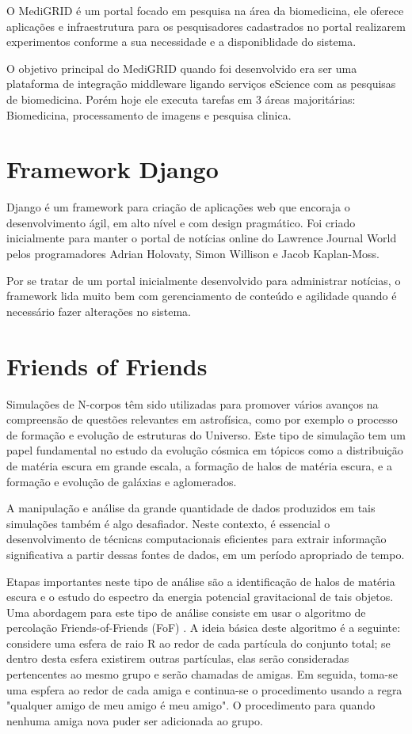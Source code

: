 \documentclass[tg]{mdtufsm}
\begin{document}
O MediGRID \cite{medigrid} é um portal focado em pesquisa na área da biomedicina, ele oferece aplicações e infraestrutura para os pesquisadores cadastrados no portal realizarem experimentos conforme a sua necessidade e a disponiblidade do sistema. 

O objetivo principal do MediGRID quando foi desenvolvido era ser uma plataforma de integração middleware ligando serviços eScience com as pesquisas de biomedicina. Porém hoje ele executa tarefas em 3 áreas majoritárias: Biomedicina, processamento de imagens e pesquisa clinica.

\section{Framework Django}
Django\cite{django} é um framework para criação de aplicações web que encoraja o desenvolvimento ágil, em alto nível e com design pragmático. Foi criado inicialmente para manter o portal de notícias online do Lawrence
Journal World pelos programadores Adrian Holovaty, Simon Willison e Jacob Kaplan-Moss.

Por se tratar de um portal inicialmente desenvolvido para administrar notícias, o framework lida muito  bem com gerenciamento de conteúdo e agilidade quando é necessário fazer alterações no sistema.


\section{Friends of Friends}
Simulações de N-corpos têm sido utilizadas para promover vários avanços na compreensão de questões relevantes em astrofísica, como por exemplo o processo de formação e evolução de estruturas do Universo. Este tipo de simulação tem um papel fundamental\cite{Bertschinger,Efstathiou} no estudo da evolução cósmica em tópicos como a distribuição de matéria escura em grande escala, a formação de halos de matéria escura, e a formação e evolução de galáxias e aglomerados.

A manipulação e análise da grande quantidade de dados produzidos em tais simulações também é algo desafiador.
Neste contexto, é essencial o desenvolvimento de técnicas computacionais eficientes para extrair informação
significativa a partir dessas fontes de dados, em um período apropriado de tempo.

Etapas importantes neste tipo de análise são a identificação de halos de matéria escura e o estudo do espectro da
energia potencial gravitacional de tais objetos. Uma abordagem para este tipo de análise consiste em usar o
algoritmo de percolação Friends-of-Friends (FoF) \cite{uchra} . A ideia básica deste algoritmo é a seguinte: considere uma
esfera de raio R ao redor de cada partícula do conjunto total; se dentro desta esfera existirem outras partículas, elas
serão consideradas pertencentes ao mesmo grupo e serão chamadas de amigas. Em seguida, toma-se uma espfera ao
redor de cada amiga e continua-se o procedimento usando a regra "qualquer amigo de meu amigo é meu amigo". O
procedimento para quando nenhuma amiga nova puder ser adicionada ao grupo.
\end{document}
